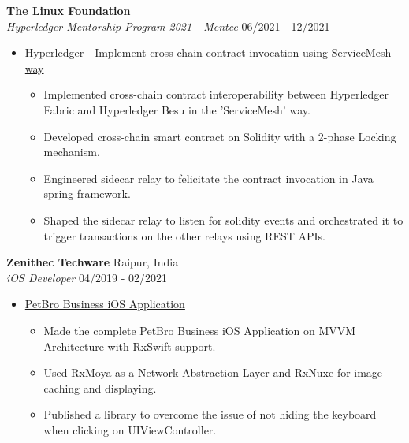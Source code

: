\documentclass{article}
\begin{document}
\vspace{3pt}

\noindent \normalsize \textbf{The Linux Foundation} \\
\textit{Hyperledger Mentorship Program 2021 - Mentee} \hfill 06/2021 - 12/2021
\begin{itemize}[noitemsep,nolistsep,leftmargin=*]
    \item {\normalsize \href{https://wiki.hyperledger.org/display/INTERN/Implement+cross+chain+contract+invocation+using+ServiceMesh+way}{Hyperledger - Implement cross chain contract invocation using ServiceMesh way}
        \begin{itemize}
            \item Implemented cross-chain contract interoperability between Hyperledger Fabric and Hyperledger Besu in the 'ServiceMesh' way.
            \item Developed cross-chain smart contract on Solidity with a 2-phase Locking mechanism.
            \item Engineered sidecar relay to felicitate the contract invocation in Java spring framework.
            \item Shaped the sidecar relay to listen for solidity events and orchestrated it to trigger transactions on the other relays using REST APIs.
        \end{itemize}
    }
\end{itemize}

\noindent \normalsize \textbf{Zenithec Techware} \hfill Raipur, India \\
\textit{iOS Developer} \hfill 04/2019 - 02/2021
\begin{itemize}[noitemsep,nolistsep,leftmargin=*]
    \item {\normalsize \href{https://apple.co/3kAiLJ0}{PetBro Business iOS Application}
        \begin{itemize}
            \item Made the complete PetBro Business iOS Application on MVVM Architecture with RxSwift support.
            \item Used RxMoya as a Network Abstraction Layer and RxNuxe for image caching and displaying.
            \item Published a library to overcome the issue of not hiding the keyboard when clicking on UIViewController.
        \end{itemize}
    }
\end{itemize}
\end{document}
